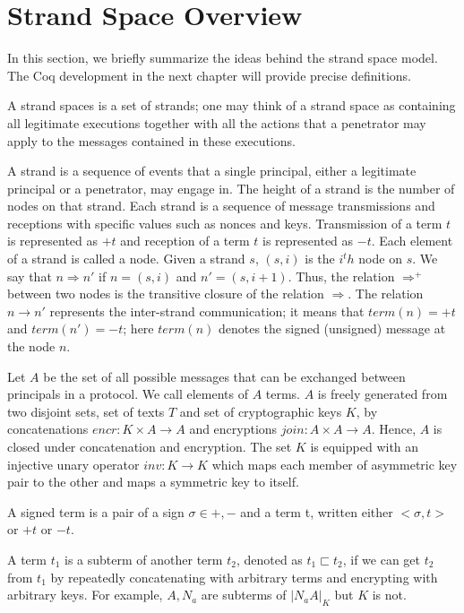 \section{Strand Space Overview}
In this section, we briefly summarize the ideas behind the strand space model. The Coq development in the next chapter will provide precise definitions.

A strand spaces is a set of strands; one may think of a strand space as containing all legitimate executions together with all the actions that a penetrator may apply to the messages contained in these executions.

A strand is a sequence of events that a single principal, either a legitimate principal or a penetrator, may engage in. The height of a strand is the number of nodes on that strand. Each strand is a sequence of message transmissions and receptions with specific values such as nonces and keys. Transmission of a term $t$ is represented as $+t$ and reception of a term $t$ is represented as $-t$. Each element of a strand is called a node. Given a strand $s$, $(s,i)$ is the $i^th$ node on $s$. We say that $n \Rightarrow n'$ if $n=(s,i)$ and $n'=(s,i+1)$. Thus, the relation $\Rightarrow^+$ between two nodes is the transitive closure of the relation $\Rightarrow$. The relation $n \rightarrow n'$ represents the inter-strand communication; it means that $term(n)=+t$ and $term(n')=-t$; here $term(n)$ denotes the signed (unsigned) message at the node $n$.

Let $A$ be the set of all possible messages that can be exchanged between principals in a protocol. We call elements of $A$ terms. $A$ is freely generated from two disjoint sets, set of texts $T$ and set of cryptographic keys $K$, by concatenations $encr : K \times A \rightarrow A$ and encryptions $join : A \times A \rightarrow A$. Hence, $A$ is closed under concatenation and encryption. The set $K$ is equipped with an injective unary operator $inv : K \rightarrow K$ which maps each member of asymmetric key pair to the other and maps a symmetric key to itself.

A signed term is a pair of a sign $\sigma \in {+,-}$ and a term t, written either $<\sigma,t>$ or $+t$ or $-t$.

A term $t_1$ is a subterm of another term $t_2$, denoted as $t_1 \sqsubset t_2$, if we can get $t_2$ from $t_1$ by repeatedly concatenating with arbitrary terms and encrypting with arbitrary keys. For example, $A, N_a$ are subterms of ${|N_aA|}_K$ but $K$ is not.

